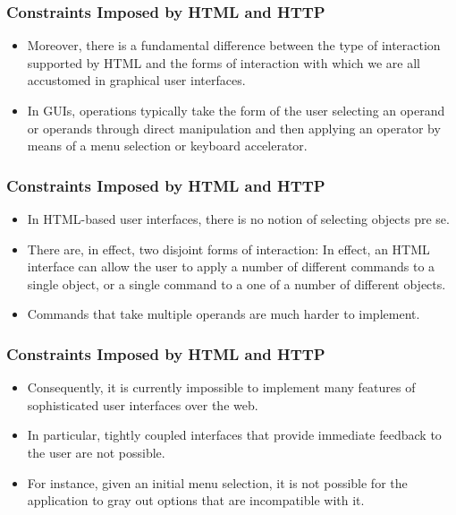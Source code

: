 \documentclass{beamer}
\begin{document}
\begin{frame}
\frametitle{Constraints Imposed by HTML and HTTP}

\begin{itemize}
\item Moreover, there is a fundamental difference between the type of interaction supported by HTML and the forms of interaction with which we are all accustomed in graphical user interfaces.
\item In GUIs, operations typically take the form of the user selecting an operand or operands through direct manipulation and then applying an operator by means of a menu selection or keyboard accelerator.
\end{itemize}

\end{frame}

\begin{frame}
\frametitle{Constraints Imposed by HTML and HTTP}

\begin{itemize}
\item In HTML-based user interfaces, there is no notion of selecting objects pre se.
\item There are, in effect, two disjoint forms of interaction: In effect, an HTML interface can allow the user to apply a number of different commands to a single object, or a single command to a one of a number of different objects.
\item Commands that take multiple operands are much harder to implement.
\end{itemize}

\end{frame}

\begin{frame}
\frametitle{Constraints Imposed by HTML and HTTP}

\begin{itemize}
\item Consequently, it is currently impossible to implement many features of sophisticated user interfaces over the web.
\item In particular, tightly coupled interfaces that provide immediate feedback to the user are not possible.
\item For instance, given an initial menu selection, it is not possible for the application to gray out options that are incompatible with it.
\end{itemize}

\end{frame}
\end{document}
